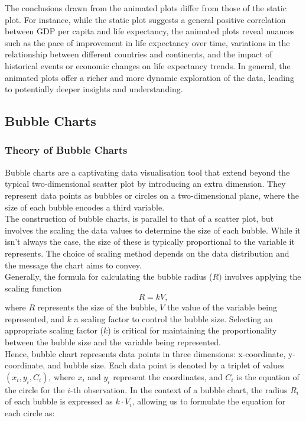 \documentclass{article}\usepackage[]{graphicx}\usepackage[]{xcolor}
\numberwithin{equation}{section}
\begin{document}
\noindent The conclusions drawn from the animated plots differ from those of the static plot. For instance, while the static plot suggests a general positive correlation between GDP per capita and life expectancy, the animated plots reveal nuances such as the pace of improvement in life expectancy over time, variations in the relationship between different countries and continents, and the impact of historical events or economic changes on life expectancy trends. In general, the animated plots offer a richer and more dynamic exploration of the data, leading to potentially deeper insights and understanding.

\subsection{Bubble Charts}
\subsubsection{Theory of Bubble Charts}
\noindent Bubble charts are a captivating data visualisation tool that extend beyond the typical two-dimensional scatter plot by introducing an extra dimension. They represent data points as bubbles or circles on a two-dimensional plane, where the size of each bubble encodes a third variable.\\

\noindent The construction of bubble charts, is parallel to that of a scatter plot, but involves the scaling the data values to determine the size of each bubble. While it isn't always the case, the size of these is typically proportional to the variable it represents. The choice of scaling method depends on the data distribution and the message the chart aims to convey.\\

\noindent Generally, the formula for calculating the bubble radius (\(R)\) involves applying the scaling function
\[
R = kV,
\]
\noindent where \(R\) represents the size of the bubble, \(V\) the value of the variable being represented, and \(k\) a scaling factor to control the bubble size. Selecting an appropriate scaling factor (\(k\)) is critical for maintaining the proportionality between the bubble size and the variable being represented.\\ 

\noindent Hence, bubble chart represents data points in three dimensions: x-coordinate, y-coordinate, and bubble size. Each data point is denoted by a triplet of values \((x_i, y_i, C_i)\), where \(x_i\) and \(y_i\) represent the coordinates, and \(C_i\) is the equation of the circle for the \(i\)-th observation. In the context of a bubble chart, the radius \(R_i\) of each bubble is expressed as \(k \cdot V_i\), allowing us to formulate the equation for each circle as:
\end{document}
